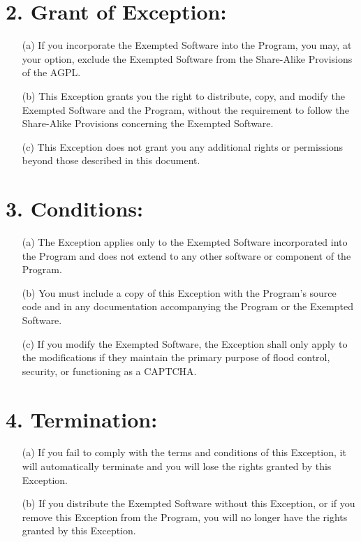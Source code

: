\documentclass[12pt]{article}
\begin{document}
\section*{2. Grant of Exception:}
\begin{enumerate}
\item[(a)] If you incorporate the Exempted Software into the Program, you may, at your option, exclude the Exempted Software from the Share-Alike Provisions of the AGPL.

\item[(b)] This Exception grants you the right to distribute, copy, and modify the Exempted Software and the Program, without the requirement to follow the Share-Alike Provisions concerning the Exempted Software.

\item[(c)] This Exception does not grant you any additional rights or permissions beyond those described in this document.
\end{enumerate}

\section*{3. Conditions:}
\begin{enumerate}
\item[(a)] The Exception applies only to the Exempted Software incorporated into the Program and does not extend to any other software or component of the Program.

\item[(b)] You must include a copy of this Exception with the Program's source code and in any documentation accompanying the Program or the Exempted Software.

\item[(c)] If you modify the Exempted Software, the Exception shall only apply to the modifications if they maintain the primary purpose of flood control, security, or functioning as a CAPTCHA.
\end{enumerate}

\section*{4. Termination:}
\begin{enumerate}
\item[(a)] If you fail to comply with the terms and conditions of this Exception, it will automatically terminate and you will lose the rights granted by this Exception.

\item[(b)] If you distribute the Exempted Software without this Exception, or if you remove this Exception from the Program, you will no longer have the rights granted by this Exception.
\end{enumerate}
\end{document}
